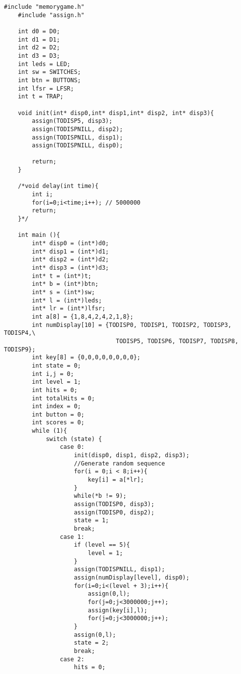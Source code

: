 \begin{lstlisting}[style=CStyle]
    #include "memorygame.h"
    #include "assign.h"
        
    int d0 = D0;
    int d1 = D1;
    int d2 = D2;
    int d3 = D3;
    int leds = LED;
    int sw = SWITCHES;
    int btn = BUTTONS;
    int lfsr = LFSR;
    int t = TRAP;
    
    void init(int* disp0,int* disp1,int* disp2, int* disp3){
        assign(TODISP5, disp3);
        assign(TODISPNILL, disp2);
        assign(TODISPNILL, disp1);
        assign(TODISPNILL, disp0);
    
        return;
    }
    
    /*void delay(int time){
        int i;
        for(i=0;i<time;i++); // 5000000
        return;
    }*/
    
    int main (){
        int* disp0 = (int*)d0;
        int* disp1 = (int*)d1;
        int* disp2 = (int*)d2;
        int* disp3 = (int*)d3;
        int* t = (int*)t;
        int* b = (int*)btn;
        int* s = (int*)sw;
        int* l = (int*)leds;
        int* lr = (int*)lfsr;
        int a[8] = {1,8,4,2,4,2,1,8};
        int numDisplay[10] = {TODISP0, TODISP1, TODISP2, TODISP3, TODISP4,\
                                TODISP5, TODISP6, TODISP7, TODISP8, TODISP9};
        int key[8] = {0,0,0,0,0,0,0,0};
        int state = 0;
        int i,j = 0;
        int level = 1;
        int hits = 0;
        int totalHits = 0;
        int index = 0;
        int button = 0;
        int scores = 0;
        while (1){
            switch (state) {
                case 0:
                    init(disp0, disp1, disp2, disp3);
                    //Generate random sequence
                    for(i = 0;i < 8;i++){
                        key[i] = a[*lr];
                    }
                    while(*b != 9);
                    assign(TODISP0, disp3);
                    assign(TODISP0, disp2);
                    state = 1;
                    break;
                case 1:
                    if (level == 5){
                        level = 1;
                    }
                    assign(TODISPNILL, disp1);
                    assign(numDisplay[level], disp0);
                    for(i=0;i<(level + 3);i++){
                        assign(0,l);
                        for(j=0;j<3000000;j++);
                        assign(key[i],l);
                        for(j=0;j<3000000;j++);
                    }
                    assign(0,l);
                    state = 2;
                    break;
                case 2:
                    hits = 0;

\end{lstlisting}
